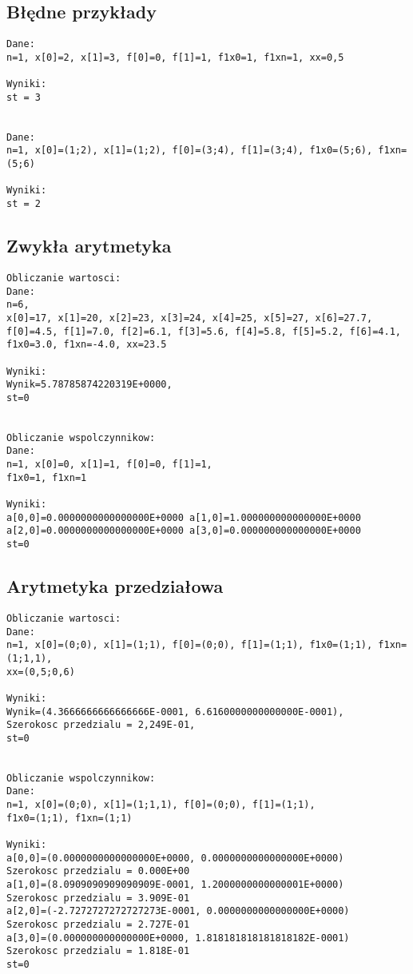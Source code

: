 \documentclass[a4paper, 10pt]{article}
\begin{document}
\subsection*{Błędne przykłady}
\begin{lstlisting}
Dane:
n=1, x[0]=2, x[1]=3, f[0]=0, f[1]=1, f1x0=1, f1xn=1, xx=0,5

Wyniki:
st = 3


Dane:
n=1, x[0]=(1;2), x[1]=(1;2), f[0]=(3;4), f[1]=(3;4), f1x0=(5;6), f1xn=(5;6)

Wyniki:
st = 2
\end{lstlisting}

\subsection*{Zwykła arytmetyka}

\begin{lstlisting}
Obliczanie wartosci:
Dane:
n=6, 
x[0]=17, x[1]=20, x[2]=23, x[3]=24, x[4]=25, x[5]=27, x[6]=27.7,
f[0]=4.5, f[1]=7.0, f[2]=6.1, f[3]=5.6, f[4]=5.8, f[5]=5.2, f[6]=4.1,
f1x0=3.0, f1xn=-4.0, xx=23.5

Wyniki:
Wynik=5.78785874220319E+0000,
st=0


Obliczanie wspolczynnikow:
Dane:
n=1, x[0]=0, x[1]=1, f[0]=0, f[1]=1,
f1x0=1, f1xn=1

Wyniki: 
a[0,0]=0.0000000000000000E+0000	a[1,0]=1.000000000000000E+0000
a[2,0]=0.0000000000000000E+0000	a[3,0]=0.000000000000000E+0000
st=0
\end{lstlisting}

\subsection*{Arytmetyka przedziałowa}

\begin{lstlisting}
Obliczanie wartosci:
Dane:
n=1, x[0]=(0;0), x[1]=(1;1), f[0]=(0;0), f[1]=(1;1), f1x0=(1;1), f1xn=(1;1,1),
xx=(0,5;0,6)

Wyniki:
Wynik=(4.3666666666666666E-0001, 6.6160000000000000E-0001),
Szerokosc przedzialu = 2,249E-01,
st=0


Obliczanie wspolczynnikow:
Dane:
n=1, x[0]=(0;0), x[1]=(1;1,1), f[0]=(0;0), f[1]=(1;1),
f1x0=(1;1), f1xn=(1;1)

Wyniki: 
a[0,0]=(0.0000000000000000E+0000, 0.0000000000000000E+0000)
Szerokosc przedzialu = 0.000E+00
a[1,0]=(8.0909090909090909E-0001, 1.2000000000000001E+0000)
Szerokosc przedzialu = 3.909E-01
a[2,0]=(-2.7272727272727273E-0001, 0.0000000000000000E+0000)
Szerokosc przedzialu = 2.727E-01
a[3,0]=(0.000000000000000E+0000, 1.818181818181818182E-0001)
Szerokosc przedzialu = 1.818E-01
st=0

\end{lstlisting}
\end{document}

